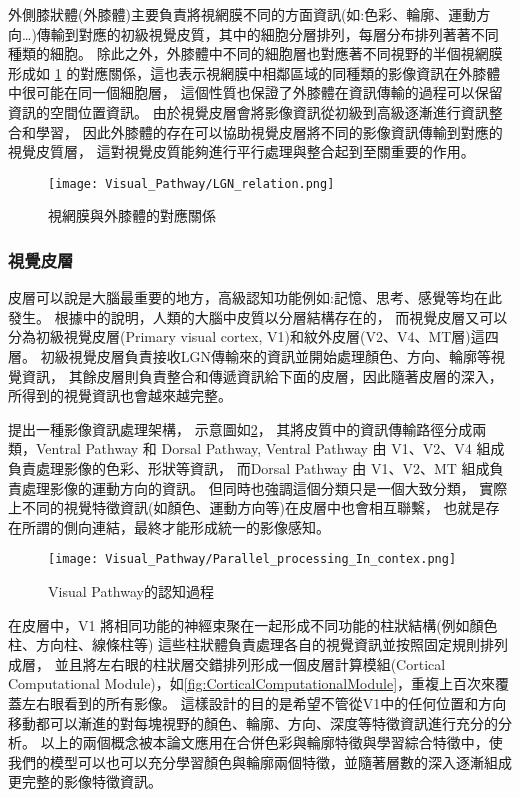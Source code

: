 \documentclass[class=NCU_thesis, crop=false]{standalone}
\begin{document}
外側膝狀體(外膝體)主要負責將視網膜不同的方面資訊(如:色彩、輪廓、運動方向…)傳輸到對應的初級視覺皮質，其中的細胞分層排列，每層分布排列著著不同種類的細胞。
除此之外，外膝體中不同的細胞層也對應著不同視野的半個視網膜形成如 \cref{fig:LGN_Relation}
的對應關係，這也表示視網膜中相鄰區域的同種類的影像資訊在外膝體中很可能在同一個細胞層，
這個性質也保證了外膝體在資訊傳輸的過程可以保留資訊的空間位置資訊。
由於視覺皮層會將影像資訊從初級到高級逐漸進行資訊整合和學習，
因此外膝體的存在可以協助視覺皮層將不同的影像資訊傳輸到對應的視覺皮質層，
這對視覺皮質能夠進行平行處理與整合起到至關重要的作用。

\begin{figure}[H]
  \centering
  \texttt{[image: Visual\_Pathway/LGN\_relation.png]}
  \caption{視網膜與外膝體的對應關係~\cite{bear2016neuroscience}}
  \label{fig:LGN_Relation}
\end{figure}
\pagebreak

\subsubsection{視覺皮層}
皮層可以說是大腦最重要的地方，高級認知功能例如:記憶、思考、感覺等均在此發生。
根據\cite{1180370208}中的說明，人類的大腦中皮質以分層結構存在的，
而視覺皮層又可以分為初級視覺皮層(Primary visual cortex, V1)和紋外皮層(V2、V4、MT層)這四層。
初級視覺皮層負責接收LGN傳輸來的資訊並開始處理顏色、方向、輪廓等視覺資訊，
其餘皮層則負責整合和傳遞資訊給下面的皮層，因此隨著皮層的深入，所得到的視覺資訊也會越來越完整。

\cite{1180370208}提出一種影像資訊處理架構，
示意圖如\cref{fig:ParallelProcess}，
其將皮質中的資訊傳輸路徑分成兩類，Ventral Pathway 和 Dorsal Pathway, 
Ventral Pathway 由 V1、V2、V4 組成負責處理影像的色彩、形狀等資訊，
而Dorsal Pathway 由 V1、V2、MT 組成負責處理影像的運動方向的資訊。
但同時也強調這個分類只是一個大致分類，
實際上不同的視覺特徵資訊(如顏色、運動方向等)在皮層中也會相互聯繫，
也就是存在所謂的側向連結，最終才能形成統一的影像感知。

\begin{figure}[H]
  \centering
  \texttt{[image: Visual\_Pathway/Parallel\_processing\_In\_contex.png]}
  \caption{Visual Pathway的認知過程~\cite{1180370208}}
  \label{fig:ParallelProcess}
\end{figure}

在皮層中，V1 將相同功能的神經束聚在一起形成不同功能的柱狀結構(例如顏色柱、方向柱、線條柱等)
這些柱狀體負責處理各自的視覺資訊並按照固定規則排列成層，
並且將左右眼的柱狀層交錯排列形成一個皮層計算模組(Cortical Computational Module)，如\cref{fig:CorticalComputationalModule}，重複上百次來覆蓋左右眼看到的所有影像。
這樣設計的目的是希望不管從V1中的任何位置和方向移動都可以漸進的對每塊視野的顏色、輪廓、方向、深度等特徵資訊進行充分的分析。
以上的兩個概念被本論文應用在合併色彩與輪廓特徵與學習綜合特徵中，使我們的模型可以也可以充分學習顏色與輪廓兩個特徵，並隨著層數的深入逐漸組成更完整的影像特徵資訊。
\end{document}
